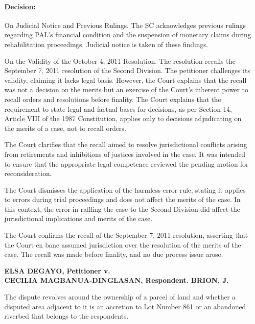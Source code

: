 \documentclass[
12pt,
oneside,
onehalfspacing,
headsepline
]{DigestCollection}
\begin{document}
\paragraph{Decision:}
\label{7c8a14d0-125c-11ef-aa24-9916ea601717}


On Judicial Notice and Previous Rulings. The SC acknowledges previous rulings regarding PAL's financial condition and the suspension of monetary claims during rehabilitation proceedings. Judicial notice is taken of these findings.

On the Validity of the October 4, 2011 Resolution. The resolution recalls the September 7, 2011 resolution of the Second Division. The petitioner challenges its validity, claiming it lacks legal basis. However, the Court explains that the recall was not a decision on the merits but an exercise of the Court's inherent power to recall orders and resolutions before finality. The Court explains that the requirement to state legal and factual bases for decisions, as per Section 14, Article VIII of the 1987 Constitution, applies only to decisions adjudicating on the merits of a case, not to recall orders.

The Court clarifies that the recall aimed to resolve jurisdictional conflicts arising from retirements and inhibitions of justices involved in the case. It was intended to ensure that the appropriate legal competence reviewed the pending motion for reconsideration.

The Court dismisses the application of the harmless error rule, stating it applies to errors during trial proceedings and does not affect the merits of the case. In this context, the error in raffling the case to the Second Division did affect the jurisdictional implications and merits of the case.

The Court confirms the recall of the September 7, 2011 resolution, asserting that the Court en banc assumed jurisdiction over the resolution of the merits of the case. The recall was made before finality, and no due process issue arose.

\label{3e0acfc0-0a1d-11ef-932c-63c852f65e48}


\noindent\textbf{ELSA DEGAYO, Petitioner v. \\CECILIA MAGBANUA-DINGLASAN, Respondent. BRION, J.}\vspace{0.4cm}

The dispute revolves around the ownership of a parcel of land and whether a disputed area adjacent to it is an accretion to Lot Number 861 or an abandoned riverbed that belongs to the respondents.
\end{document}
